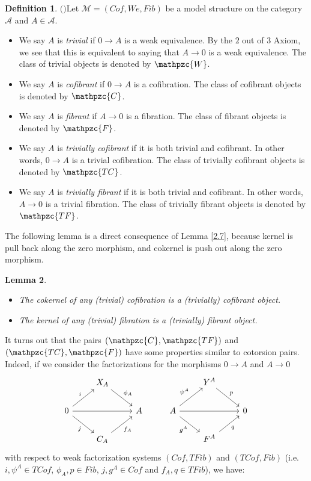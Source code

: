 \documentclass[12pt]{amsart}
\numberwithin{equation}{section}
\newtheorem{lemma}{Lemma}[section]
\theoremstyle{definition}
\newtheorem{definition}[lemma]{Definition}
\newtheorem*{theorem 0*}{Theorem}
\newtheorem*{theorem a*}{Theorem A}
\newtheorem*{theorem b*}{Theorem B}
\numberwithin{diagram}{section}
\begin{document}
\begin{definition}$($\cite[Page 88]{G}$)$\label{2.8}
Let $\mathcal{M}=(Cof,We,Fib)$ be a model structure on the category $\mathcal{A}$ and $A\in\mathcal{A}$.
\begin{itemize}
\item[(1)]
We say $A$ is {\it trivial} if $0\rightarrow A$ is a weak equivalence.
By the $2$ out of $3$ Axiom, we see that this is equivalent to saying that $A\rightarrow 0$ is a weak
equivalence. The class of trivial objects is denoted by $\mathpzc{W}$.
\item[(2)] 
We say $A$ is {\it cofibrant} if $0\rightarrow A$ is a cofibration. The class of cofibrant objects is denoted by $\mathpzc{C}$.
\item[(3)]
We say $A$ is {\it fibrant} if $A\rightarrow 0$ is a fibration. The class of fibrant objects is denoted by $\mathpzc{F}$.
\item[(4)]
We say $A$ is {\it trivially cofibrant} if it is both trivial and cofibrant. In other
words, $0\rightarrow A$ is a trivial cofibration. The class of trivially cofibrant objects is denoted by $\mathpzc{TC}$. 
\item[(5)]
We say $A$ is {\it trivially fibrant} if it is both trivial and cofibrant. In other
words, $A\rightarrow 0$ is a trivial fibration. The class of trivially fibrant objects is denoted by $\mathpzc{TF}$. 
\end{itemize}
\end{definition}

The following lemma is a direct consequence of Lemma \ref{2.7}, because kernel is pull back along the zero morphism, and cokernel is push out along the zero morphism.

\begin{lemma}\label{2.9}
\begin{itemize}
\item[(1)]
The cokernel of any (trivial) cofibration is a (trivially) cofibrant object.
\item[(2)]
The kernel of any (trivial) fibration is a (trivially) fibrant object.
\end{itemize}
\end{lemma}
	
It turns out that the pairs $(\mathpzc{C},\mathpzc{TF})$ and  $(\mathpzc{TC},\mathpzc{F})$ have some properties similar to cotorsion pairs. Indeed, if we consider the factorizations for the morphisms $0\rightarrow A$ and $A\rightarrow 0$
\[\begin{tikzcd}
& {X_A} &&& {Y^A} & \\
0 && A & A && 0 \\
& {C_A} &&& {F^A}
\arrow["{\phi_A}", from=1-2, to=2-3]
\arrow["p", from=1-5, to=2-6]
\arrow["i", from=2-1, to=1-2]
\arrow[from=2-1, to=2-3]
\arrow["j"', from=2-1, to=3-2]
\arrow["{\psi^A}", from=2-4, to=1-5]
\arrow[from=2-4, to=2-6]
\arrow["{g^A}"', from=2-4, to=3-5]
\arrow["{f_A}"', from=3-2, to=2-3]
\arrow["q"', from=3-5, to=2-6]
\end{tikzcd}\]
with respect to weak factorization systems $(Cof,TFib)$ and $(TCof,Fib)$ (i.e. $i, \psi^A\in TCof$, $\phi_A, p\in Fib$, $j, g^A\in Cof$ and $f_A, q\in TFib$), we have:
\end{document}
